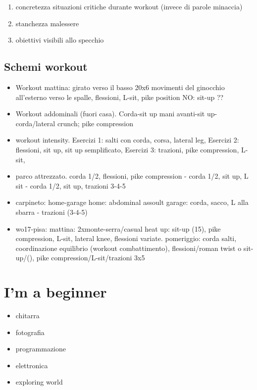 \begin{enumerate}
\item concretezza situazioni critiche durante workout (invece di parole minaccia)
\item stanchezza malessere
\item obiettivi visibili allo specchio
\end{enumerate}

\subsection{Schemi workout}

\begin{itemize}
\item Workout mattina: girato verso il basso 20x6 movimenti del ginocchio all'esterno verso le spalle,
flessioni, L-sit, pike position
NO: sit-up ??
\item Workout addominali (fuori casa). Corda-sit up mani avanti-sit up-corda/lateral crunch; pike compression
\item workout intensity.
Esercizi 1: salti con corda, corsa, lateral leg, 
Esercizi 2: flessioni, sit up, sit up semplificato,
Esercizi 3: trazioni, pike compression, L-sit, 
\item parco attrezzato.
corda 1/2, flessioni, pike compression - corda 1/2, sit up, L sit - corda 1/2, sit up, trazioni 3-4-5
\item carpineto: home-garage
home: abdominal assoult
garage: corda, sacco, L alla sbarra - trazioni (3-4-5)
\item wo17-pisa: mattina: 2xmonte-serra/casual heat up: sit-up (15), pike compression, L-sit, lateral knee, flessioni variate.
pomeriggio: corda salti, coordinazione equilibrio (workout combattimento), flessioni/roman twist o sit-up/(), pike compression/L-sit/trazioni 3x5
\end{itemize} 

\section{I'm a beginner}

\begin{itemize}
\item chitarra
\item fotografia
\item programmazione
\item elettronica
\item exploring world
\end{itemize}
